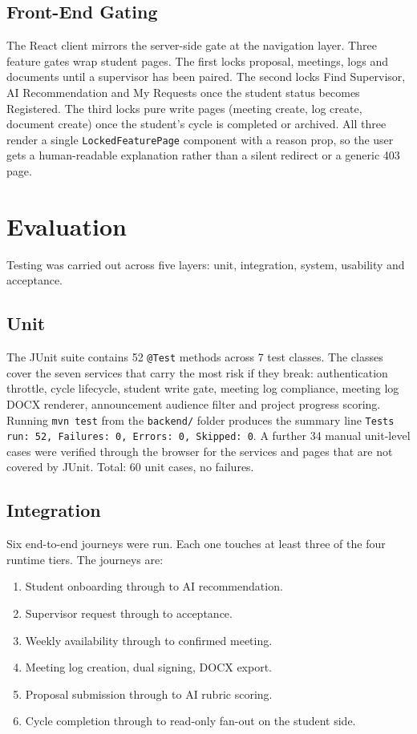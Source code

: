 \documentclass[conference,a4paper]{IEEEtran}
\begin{document}
\subsection{Front-End Gating}
The React client mirrors the server-side gate at the navigation layer. Three feature gates wrap student pages. The first locks proposal, meetings, logs and documents until a supervisor has been paired. The second locks Find Supervisor, AI Recommendation and My Requests once the student status becomes Registered. The third locks pure write pages (meeting create, log create, document create) once the student's cycle is completed or archived. All three render a single \texttt{LockedFeaturePage} component with a reason prop, so the user gets a human-readable explanation rather than a silent redirect or a generic 403 page.

\section{Evaluation}
Testing was carried out across five layers: unit, integration, system, usability and acceptance.

\subsection{Unit}
The JUnit suite contains 52 \texttt{@Test} methods across 7 test classes. The classes cover the seven services that carry the most risk if they break: authentication throttle, cycle lifecycle, student write gate, meeting log compliance, meeting log DOCX renderer, announcement audience filter and project progress scoring. Running \texttt{mvn test} from the \texttt{backend/} folder produces the summary line \texttt{Tests run: 52, Failures: 0, Errors: 0, Skipped: 0}. A further 34 manual unit-level cases were verified through the browser for the services and pages that are not covered by JUnit. Total: 60 unit cases, no failures.

\subsection{Integration}
Six end-to-end journeys were run. Each one touches at least three of the four runtime tiers. The journeys are:

\begin{enumerate}
\item Student onboarding through to AI recommendation.
\item Supervisor request through to acceptance.
\item Weekly availability through to confirmed meeting.
\item Meeting log creation, dual signing, DOCX export.
\item Proposal submission through to AI rubric scoring.
\item Cycle completion through to read-only fan-out on the student side.
\end{enumerate}
\end{document}
